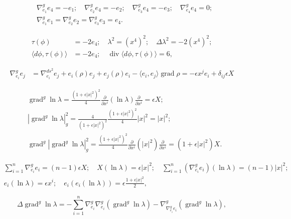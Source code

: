 \documentclass[12pt]{article}
\begin{document}
\begin{align*}
&\nabla^{g}_{e_{1}} e_{4} = - e_{1} ; \quad \nabla^{g}_{e_{2}} e_{4} = - e_{2} ;\quad
\nabla^{g}_{e_{3}} e_{4} = - e_{3} ; \quad \nabla^{g}_{e_{4}} e_{4} = 0 ; \\
&\nabla^{g}_{e_{1}} e_{1} =  \nabla^{g}_{e_{2}} e_{2} = \nabla^{g}_{e_{3}} e_{3} =
e_{4}.
\end{align*}

\begin{align*}
\tau(\phi) &= -2e_{4} ; \quad  \lambda^2 = (x^4)^2 ; \quad \Delta \lambda^2 = -2 (x^4)^2 ; \\
\langle d\phi , \tau(\phi) \rangle &= -2 e_{4} ; \quad \operatorname{div} \langle d\phi , \tau(\phi)
\rangle = 6 ,
\end{align*}

\begin{align*}
\nabla^{g}_{e_{i}}e_{j} &= \nabla^{ds^2}_{e_{i}}e_{j} + e_{i}(\rho)e_{j} + e_{j}(\rho)e_{i} - \langle
e_{i},e_{j} \rangle \operatorname{grad} \rho  = - \epsilon x^j e_{i} + \delta_{ij} \epsilon X
\end{align*}

\begin{align*}
&\operatorname{grad}^{g} \ln\lambda = \tfrac{(1+\epsilon |x|^2)^2}{4}\tfrac{\partial}{\partial x^i}
(\ln\lambda) \tfrac{\partial}{\partial x^i} =  \epsilon X ;\\
&|\operatorname{grad}^g \ln\lambda|_{g}^{2} = \tfrac{4}{(1+\epsilon |x|^2)^2} \tfrac{(1+\epsilon |x|^2)^2}{4} |x|^2 = |x|^2 ;\\
&\operatorname{grad}^g |\operatorname{grad}^g \ln\lambda|_{g}^{2} =\tfrac{(1+\epsilon |x|^2)^2}{4}
\tfrac{\partial}{\partial x^i} (|x|^2) \tfrac{\partial}{\partial x^i}
=(1+\epsilon |x|^2) X .
\end{align*}

\begin{align*}
& \sum_{i=1}^{n} \nabla^{g}_{e_{i}}e_{i} = (n-1) \epsilon X ; \quad  X(\ln \lambda) =
\epsilon |x|^2 ; \quad
\sum_{i=1}^{n} (\nabla^{g}_{e_{i}}e_{i}) (\ln \lambda) = (n-1) |x|^2 ;\\
&e_{i} (\ln\lambda) = \epsilon x^i ;\quad  e_{i}(e_{i} (\ln\lambda)) = \epsilon
\tfrac{1+\epsilon |x|^2}{2} ,
\end{align*}

$$\Delta \operatorname{grad}^g \ln\lambda = - \sum_{i=1}^{n} \nabla^{g}_{e_{i}}\nabla^{g}_{e_{i}} (\operatorname{grad}^g \ln\lambda)
 - \nabla^{g}_{\nabla^{g}_{e_{i}}e_{i}} (\operatorname{grad}^g \ln\lambda) , $$
\end{document}
